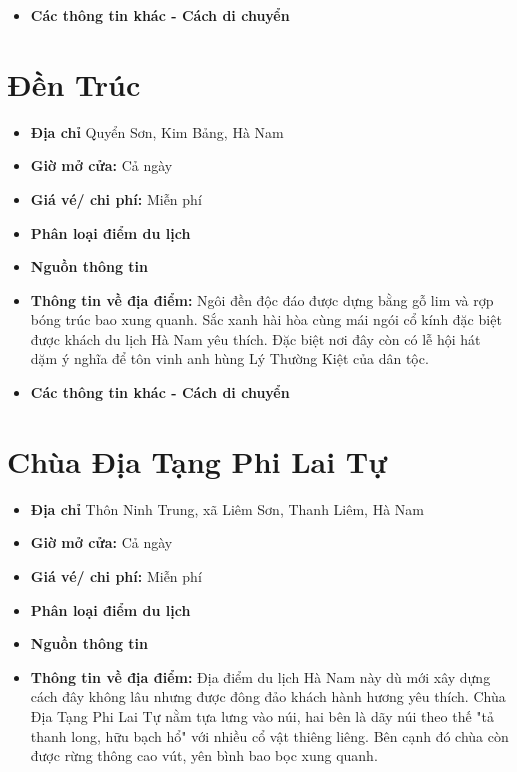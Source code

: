 \documentclass{article}
\begin{document}
\begin{itemize}
    \item{\textbf{Các thông tin khác - Cách di chuyển}} 
\end{itemize}

\section{Đền Trúc}
\begin{itemize}
    \item{\textbf{Địa chỉ}} Quyển Sơn, Kim Bảng, Hà Nam

    \item{\textbf{Giờ mở cửa:}} Cả ngày

    \item{\textbf{Giá vé/ chi phí:}} Miễn phí

    \item{\textbf{Phân loại điểm du lịch}} 

    \item{\textbf{Nguồn thông tin}} 

    \item{\textbf{Thông tin về địa điểm:}} Ngôi đền độc đáo được dựng bằng gỗ lim và rợp bóng trúc bao xung quanh. Sắc xanh hài hòa cùng mái ngói cổ kính đặc biệt được khách du lịch Hà Nam yêu thích. Đặc biệt nơi đây còn có lễ hội hát dặm ý nghĩa để tôn vinh anh hùng Lý Thường Kiệt của dân tộc.
\end{itemize}

\begin{itemize}
    \item{\textbf{Các thông tin khác - Cách di chuyển}} 
\end{itemize}

\section{Chùa Địa Tạng Phi Lai Tự}
\begin{itemize}
    \item{\textbf{Địa chỉ}} Thôn Ninh Trung, xã Liêm Sơn, Thanh Liêm, Hà Nam

    \item{\textbf{Giờ mở cửa:}} Cả ngày

    \item{\textbf{Giá vé/ chi phí:}} Miễn phí

    \item{\textbf{Phân loại điểm du lịch}} 

    \item{\textbf{Nguồn thông tin}} 

    \item{\textbf{Thông tin về địa điểm:}} Địa điểm du lịch Hà Nam này dù mới xây dựng cách đây không lâu nhưng được đông đảo khách hành hương yêu thích. Chùa Địa Tạng Phi Lai Tự nằm tựa lưng vào núi, hai bên là dãy núi theo thế "tả thanh long, hữu bạch hổ" với nhiều cổ vật thiêng liêng. Bên cạnh đó chùa còn được rừng thông cao vút, yên bình bao bọc xung quanh.
\end{itemize}
\end{document}
